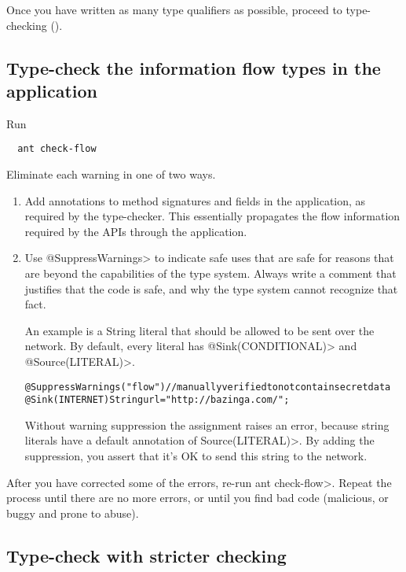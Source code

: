 Once you have written as many type qualifiers as possible, proceed to
type-checking ().



\subsection{Type-check the information flow types in the application\label{sec:run-type-checker}}

Run

\begin{Verbatim}
  ant check-flow
\end{Verbatim}

Eliminate each warning in one of two ways.
\begin{enumerate}
\item Add annotations to method signatures and fields in the application, as
required by the type-checker. This essentially propagates the flow
information required by the APIs through the application.

\item Use \<@SuppressWarnings> to indicate safe uses that are safe for reasons
that are beyond the capabilities of the type system. Always write a
comment that justifies that the code is safe, and why the type system
cannot recognize that fact.

An example is a String literal that should be allowed to be sent
over the network. By default, every literal has \<@Sink(CONDITIONAL)> 
and \<@Source(LITERAL)>.

\begin{alltt}
    @SuppressWarnings("flow") // manually verified to not contain secret data
    @Sink(INTERNET) String url = "http://bazinga.com/";
\end{alltt}

Without warning suppression the assignment raises an error, because string literals
have a default annotation of \<Source(LITERAL)>. By adding the suppression, you
assert that it's OK to send this string to the network. 

\end{enumerate}

After you have corrected some of the errors, re-run \<ant check-flow>.
Repeat the process until there are no more errors, or until you find bad
code (malicious, or buggy and prone to abuse).


\subsection{Type-check with stricter checking}

